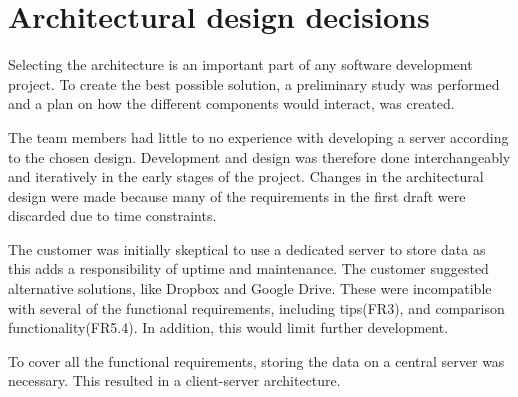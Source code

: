\section{Architectural design decisions}
\label{sec:arch_design}
Selecting the architecture is an important part of any software development project. To create the best possible solution, a preliminary study was performed and a plan on how the different components would interact, was created. 

The team members had little to no experience with developing a server according to the chosen design. Development and design was therefore done interchangeably and iteratively in the early stages of the project. Changes in the architectural design were made because many of the requirements in the first draft were discarded due to time constraints. 

The customer was initially skeptical to use a dedicated server to store data as this adds a responsibility of uptime and maintenance. The customer suggested alternative solutions, like Dropbox and Google Drive.
These were incompatible with several of the functional requirements, including tips(FR3), and comparison functionality(FR5.4). In addition, this would limit further development. 

To cover all the functional requirements, storing the data on a central server was necessary. This resulted in a client-server architecture. 